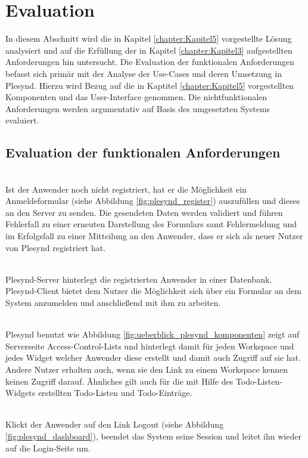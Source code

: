 \section{Evaluation}
In diesem Abschnitt wird die in Kapitel \ref{chapter:Kapitel5} vorgestellte Lösung analysiert und auf die Erfüllung der in Kapitel \ref{chapter:Kapitel3} aufgestellten Anforderungen hin untersucht. Die Evaluation der funktionalen Anforderungen befasst sich primär mit der Analyse der Use-Cases und deren Umsetzung in Plesynd. Hierzu wird Bezug auf die in Kaptitel \ref{chapter:Kapitel5} vorgestellten Komponenten und das User-Interface genommen. Die nichtfunktionalen Anforderungen werden argumentativ auf Basis des umgesetzten Systems evaluiert.

\subsection{Evaluation der funktionalen Anforderungen}\label{section:funktionale_anforderungen_evaluation}
\textbullet{}  \emph{\requirementRegistrieren}\\
Ist der Anwender noch nicht registriert, hat er die Möglichkeit ein Anmeldeformular (siehe Abbildung \ref{fig:plesynd_register}) auszufüllen und dieses an den Server zu senden. Die gesendeten Daten werden validiert und führen Fehlerfall zu einer erneuten Darstellung des Formulars samt Fehlermeldung und im Erfolgsfall zu einer Mitteilung an den Anwender, dass er sich als neuer Nutzer von Plesynd registriert hat.

\textbullet{}  \emph{\requirementLogin}\\
Plesynd-Server hinterlegt die registrierten Anwender in einer Datenbank. Plesynd-Client bietet dem Nutzer die Möglichkeit sich über ein Formular an dem System anzumelden und anschließend mit ihm zu arbeiten.

\textbullet{}  \emph{\requirementZugriffAufEigeneWidgets}\\
Plesynd benutzt wie Abbildung \ref{fig:ueberblick_plesynd_komponenten} zeigt auf Serverseite Access-Control-Lists und hinterlegt damit für jeden Workspace und jedes Widget welcher Anwender diese erstellt und damit auch Zugriff auf sie hat. Andere Nutzer erhalten auch, wenn sie den Link zu einem Workspace kennen keinen Zugriff darauf. Ähnliches gilt auch für die mit Hilfe des Todo-Listen-Widgets erstellten Todo-Listen und Todo-Einträge.

\textbullet{}  \emph{\requirementLogout}\\
Klickt der Anwender auf den Link Logout (siehe Abbildung \ref{fig:plesynd_dashboard}), beendet das System seine Session und leitet ihn wieder auf die Login-Seite um. 

